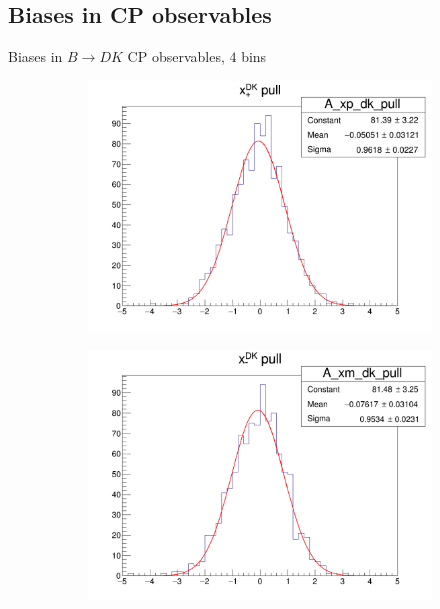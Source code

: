\documentclass{beamer}
\begin{document}
\subsection{Biases in CP observables}
\begin{frame}{Biases in $B\to DK$ CP observables, $4$ bins}
  \begin{figure}
    \centering
    \vspace{-0.2cm}
    \begin{subfigure}{0.42\textwidth}
      \includegraphics[width = 1.0\textwidth]{A_xp_dk_4Bins_pull.png}
    \end{subfigure}%
    \begin{subfigure}{0.42\textwidth}
      \includegraphics[width = 1.0\textwidth]{A_xm_dk_4Bins_pull.png}

\end{subfigure}
\end{figure}
\end{frame}
\end{document}
